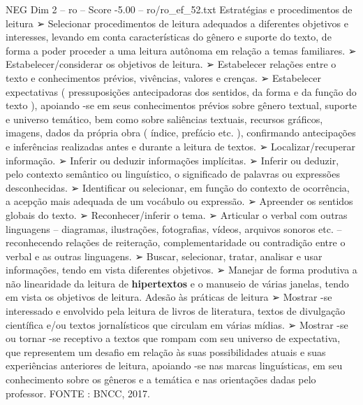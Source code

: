 \begin{textsample}{NEG Dim 2 – ro – Score -5.00 – ro/ro\_ef\_52.txt}
Estratégias e procedimentos de leitura {\EmojiFont ➢} Selecionar procedimentos de leitura adequados a diferentes objetivos e interesses, levando em conta características do gênero e suporte do texto, de forma a poder proceder a uma leitura autônoma em relação a temas familiares. {\EmojiFont ➢} Estabelecer/considerar os objetivos de leitura. {\EmojiFont ➢} Estabelecer relações entre o texto e conhecimentos prévios, vivências, valores e crenças. {\EmojiFont ➢} Estabelecer expectativas ( pressuposições antecipadoras dos sentidos, da forma e da função do texto ), apoiando -se em seus conhecimentos prévios sobre gênero textual, suporte e universo temático, bem como sobre saliências textuais, recursos gráficos, imagens, dados da própria obra ( índice, prefácio etc. ), confirmando antecipações e inferências realizadas antes e durante a leitura de textos. {\EmojiFont ➢} Localizar/recuperar informação. {\EmojiFont ➢} Inferir ou deduzir informações implícitas. {\EmojiFont ➢} Inferir ou deduzir, pelo contexto semântico ou linguístico, o significado de palavras ou expressões desconhecidas. {\EmojiFont ➢} Identificar ou selecionar, em função do contexto de ocorrência, a acepção mais adequada de um vocábulo ou expressão. {\EmojiFont ➢} Apreender os sentidos globais do texto. {\EmojiFont ➢} Reconhecer/inferir o tema. {\EmojiFont ➢} Articular o verbal com outras linguagens – diagramas, ilustrações, fotografias, vídeos, arquivos sonoros etc. – reconhecendo relações de reiteração, complementaridade ou contradição entre o verbal e as outras linguagens. {\EmojiFont ➢} Buscar, selecionar, tratar, analisar e usar informações, tendo em vista diferentes objetivos. {\EmojiFont ➢} Manejar de forma produtiva a não linearidade da leitura de \textbf{hipertextos} e o manuseio de várias janelas, tendo em vista os objetivos de leitura.
Adesão às práticas de leitura {\EmojiFont ➢} Mostrar -se interessado e envolvido pela leitura de livros de literatura, textos de divulgação científica e/ou textos jornalísticos que circulam em várias mídias. {\EmojiFont ➢} Mostrar -se ou tornar -se receptivo a textos que rompam com seu universo de expectativa, que representem um desafio em relação às suas possibilidades atuais e suas experiências anteriores de leitura, apoiando -se nas marcas linguísticas, em seu conhecimento sobre os gêneros e a temática e nas orientações dadas pelo professor.
FONTE : BNCC, 2017.

\end{textsample}
